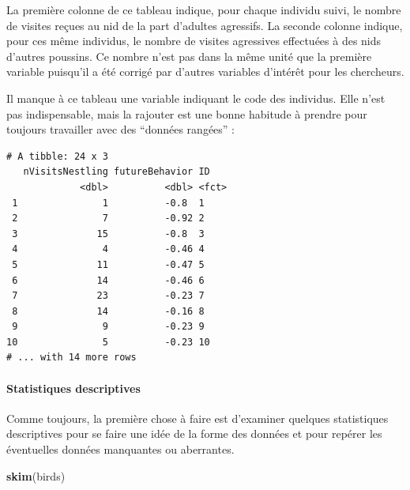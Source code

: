 \documentclass[a4paperpaper,]{article}
\newenvironment{Shaded}{\begin{snugshade}}{\end{snugshade}}
\newcommand{\DataTypeTok}[1]{\textcolor[rgb]{0.00,0.34,0.68}{#1}}
\newcommand{\DecValTok}[1]{\textcolor[rgb]{0.69,0.50,0.00}{#1}}
\newcommand{\KeywordTok}[1]{\textcolor[rgb]{0.12,0.11,0.11}{\textbf{#1}}}
\newcommand{\NormalTok}[1]{\textcolor[rgb]{0.12,0.11,0.11}{#1}}
\newcommand{\OperatorTok}[1]{\textcolor[rgb]{0.12,0.11,0.11}{#1}}
\newcommand{\StringTok}[1]{\textcolor[rgb]{0.75,0.01,0.01}{#1}}
\let\oldparagraph\paragraph
\renewcommand{\paragraph}[1]{\oldparagraph{#1}\mbox{}}
\begin{document}
La première colonne de ce tableau indique, pour chaque individu suivi, le nombre de visites reçues au nid de la part d'adultes agressifs. La seconde colonne indique, pour ces même individus, le nombre de visites agressives effectuées à des nids d'autres poussins. Ce nombre n'est pas dans la même unité que la première variable puisqu'il a été corrigé par d'autres variables d'intérêt pour les chercheurs.

Il manque à ce tableau une variable indiquant le code des individus. Elle n'est pas indispensable, mais la rajouter est une bonne habitude à prendre pour toujours travailler avec des ``données rangées'' :

\begin{Shaded}
\end{Shaded}

\begin{verbatim}
# A tibble: 24 x 3
   nVisitsNestling futureBehavior ID   
             <dbl>          <dbl> <fct>
 1               1          -0.8  1    
 2               7          -0.92 2    
 3              15          -0.8  3    
 4               4          -0.46 4    
 5              11          -0.47 5    
 6              14          -0.46 6    
 7              23          -0.23 7    
 8              14          -0.16 8    
 9               9          -0.23 9    
10               5          -0.23 10   
# ... with 14 more rows
\end{verbatim}

\hypertarget{statistiques-descriptives-4}{%
\paragraph{Statistiques descriptives}\label{statistiques-descriptives-4}}

Comme toujours, la première chose à faire est d'examiner quelques statistiques descriptives pour se faire une idée de la forme des données et pour repérer les éventuelles données manquantes ou aberrantes.

\begin{Shaded}
\begin{Highlighting}[]
\KeywordTok{skim}\NormalTok{(birds)}
\end{Highlighting}
\end{Shaded}
\end{document}
